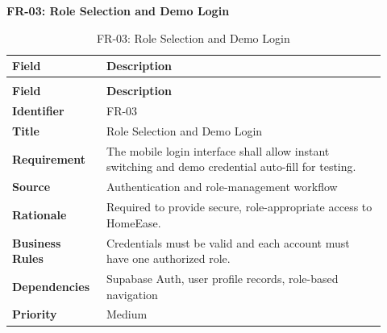 \documentclass[12pt,a4paper]{article}
\begin{document}
\noindent\textbf{FR-03: Role Selection and Demo Login}\par
\vspace{4pt}
\begingroup\small\setlength{\tabcolsep}{4pt}\renewcommand{\arraystretch}{1.15}
\begin{longtable}{|>{\raggedright\arraybackslash}p{0.22\linewidth}|>{\raggedright\arraybackslash}p{0.70\linewidth}|}
\caption{FR-03: Role Selection and Demo Login}\label{tab:fr-03}\\
\hline
\textbf{Field} & \textbf{Description} \\ \hline
\endfirsthead
\multicolumn{2}{c}{Table \thetable\ Role Selection and Demo Login (continued)}\\
\hline
\textbf{Field} & \textbf{Description} \\ \hline
\endhead
\textbf{Identifier} & FR-03 \\ \hline
\textbf{Title} & Role Selection and Demo Login \\ \hline
\textbf{Requirement} & The mobile login interface shall allow instant switching and demo credential auto-fill for testing. \\ \hline
\textbf{Source} & Authentication and role-management workflow \\ \hline
\textbf{Rationale} & Required to provide secure, role-appropriate access to HomeEase. \\ \hline
\textbf{Business Rules} & Credentials must be valid and each account must have one authorized role. \\ \hline
\textbf{Dependencies} & Supabase Auth, user profile records, role-based navigation \\ \hline
\textbf{Priority} & Medium \\ \hline
\end{longtable}
\endgroup
\end{document}
